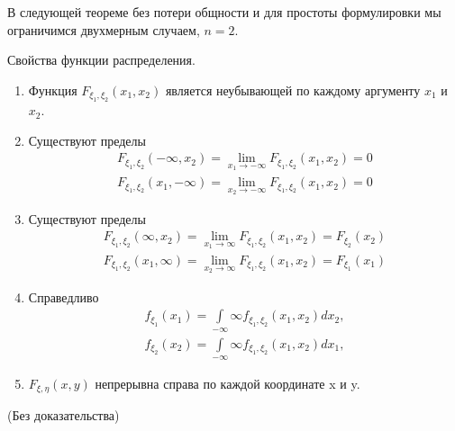 В следующей теореме без потери общности и для простоты формулировки мы ограничимся двухмерным случаем, $n = 2$.

\begin{theorem}
\label{th:15.7}
Свойства функции распределения.
\begin{enumerate}
	\item Функция $F_{\xi_1,\xi_2}(x_1,x_2)$ является неубывающей по каждому аргументу $x_1$ и $x_2$.

	\item Существуют пределы 
	\begin{gather*}
	F_{\xi_1,\xi_2}(-\infty,x_2)=\lim\limits_{x_1\to-\infty}
	F_{\xi_1,\xi_2}(x_1,x_2)=0 \\
	F_{\xi_1,\xi_2}(x_1,-\infty)=\lim\limits_{x_2\to-\infty}
	F_{\xi_1,\xi_2}(x_1,x_2)=0
	\end{gather*}

	\item Существуют пределы 
	\begin{gather*}
	F_{\xi_1,\xi_2}(\infty,x_2)=\lim\limits_{x_1\to\infty}
	F_{\xi_1,\xi_2}(x_1,x_2)=F_{\xi_2}(x_2) \\
	F_{\xi_1,\xi_2}(x_1,\infty)=\lim\limits_{x_2\to\infty}
	F_{\xi_1,\xi_2}(x_1,x_2)=F_{\xi_1}(x_1)
	\end{gather*}

	\item Справедливо
	\begin{gather*}
	f_{\xi_1}(x_1)=\int\limits_{-\infty}{\infty}f_{\xi_1,\xi_2}(x_1,x_2)dx_2, \\
	f_{\xi_2}(x_2)=\int\limits_{-\infty}{\infty}f_{\xi_1,\xi_2}(x_1,x_2)dx_1,
	\end{gather*}

	\item $F_{\xi,\eta}(x, y)$ непрерывна справа по каждой координате x и y.



\end{enumerate}
(Без доказательства)
\end{theorem}

